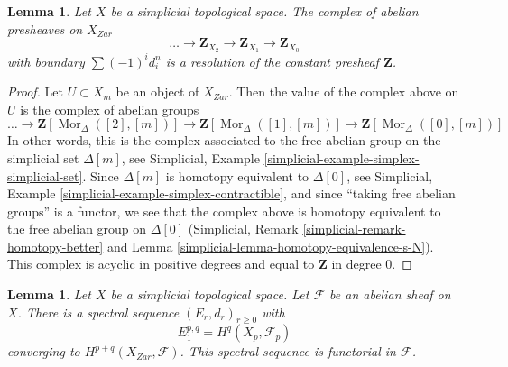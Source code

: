 \documentclass{stacks-project}
\theoremstyle{plain}
\newtheorem{lemma}[subsection]{Lemma}
\theoremstyle{definition}
\theoremstyle{remark}
\numberwithin{equation}{subsection}
\def\Mor{\mathop{\mathrm{Mor}}\nolimits}
\begin{document}
\begin{lemma}
\label{lemma-simplicial-resolution-Z}
Let $X$ be a simplicial topological space. The complex of
abelian presheaves on $X_{Zar}$
$$
\ldots \to \mathbf{Z}_{X_2} \to \mathbf{Z}_{X_1} \to \mathbf{Z}_{X_0}
$$
with boundary $\sum (-1)^i d^n_i$ is a resolution
of the constant presheaf $\mathbf{Z}$.
\end{lemma}

\begin{proof}
Let $U \subset X_m$ be an object of $X_{Zar}$. Then the value of
the complex above on $U$ is the complex of abelian groups
$$
\ldots \to
\mathbf{Z}[\Mor_\Delta([2], [m])] \to
\mathbf{Z}[\Mor_\Delta([1], [m])] \to
\mathbf{Z}[\Mor_\Delta([0], [m])]
$$
In other words, this is the complex associated to the
free abelian group on the simplicial set $\Delta[m]$, see
Simplicial, Example \ref{simplicial-example-simplex-simplicial-set}.
Since $\Delta[m]$ is homotopy equivalent to $\Delta[0]$, see
Simplicial, Example \ref{simplicial-example-simplex-contractible},
and since ``taking free abelian groups'' is a functor,
we see that the complex above is homotopy equivalent to
the free abelian group on $\Delta[0]$
(Simplicial, Remark \ref{simplicial-remark-homotopy-better} and
Lemma \ref{simplicial-lemma-homotopy-equivalence-s-N}).
This complex is acyclic in positive degrees
and equal to $\mathbf{Z}$ in degree $0$.
\end{proof}

\begin{lemma}
\label{lemma-simplicial-sheaf-cohomology}
Let $X$ be a simplicial topological space. Let $\mathcal{F}$ be an abelian
sheaf on $X$. There is a spectral sequence $(E_r, d_r)_{r \geq 0}$ with
$$
E_1^{p, q} = H^q(X_p, \mathcal{F}_p)
$$
converging to $H^{p + q}(X_{Zar}, \mathcal{F})$.
This spectral sequence is functorial in $\mathcal{F}$.
\end{lemma}
\end{document}
